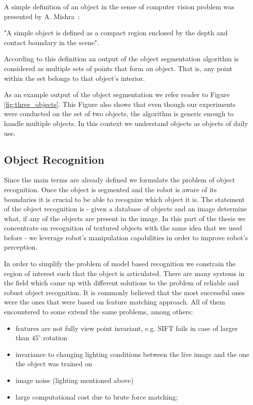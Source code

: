 A simple definition of an object in the sense of computer vision problem was presented by A. Mishra~\cite{mishra2012segmenting}:

\noindent "A simple object is defined as a compact region enclosed by the depth and
contact boundary in the scene".

According to this definition an output of the object segmentation algorithm is considered as multiple sets of points that form an object. That is, any point within the set belongs to that object's interior. 

As an example output of the object segmentation we refer reader to Figure \ref{fig:three_objects}. This Figure also shows that even though our experiments were conducted on the set of two objects, the algorithm is generic enough to handle multiple objects. In this context we understand objects as objects of daily use.


\subsection{Object Recognition}

Since the main terms are already defined we formulate the problem of object recognition. Once the object is segmented and the robot is aware of its boundaries it is crucial to be able to recognize which object it is. The statement of the object recognition is -  
given a database of objects and an image determine what, if any of the objects are present in the image. In this part of the thesis we concentrate on recognition of textured objects with the same idea that we used before - we leverage robot's manipulation capabilities in order to improve robot's perception.

In order to simplify the problem of model based recognition we constrain the region of interest such that the object is articulated. There are many systems in the field which came up with different solutions to the problem of reliable and robust object recognition. It is commonly believed that the most successful ones were the ones that were based on feature matching approach. All of them encountered to some extend the same problems, among others:

\begin{itemize}
\item features are not fully view point invariant, e.g. SIFT fails in case of larger than
$45^\circ$ rotation
\item  invariance to changing lighting conditions between the live
image and the one the object was trained on
\item image noise (lighting mentioned above)
\item large computational cost due to brute force matching;
\end{itemize}

